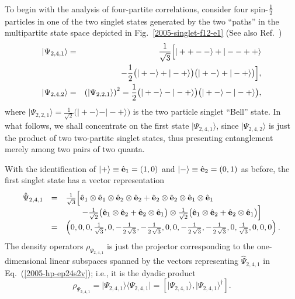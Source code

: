 \documentclass[pra,amsfonts,showpacs,showkeys,preprint]{revtex4}
\begin{document}
To begin with the analysis of four-partite correlations,  consider four spin-${1\over 2}$
particles in one of the two singlet states generated by the two ``paths''
in the multipartite state space depicted in Fig.~\ref{2005-singlet-f12-e1}
(See also Ref.~\cite{schimpf-svozil})
\begin{eqnarray}
\vert \Psi_{2,4,1} \rangle
&=&
{1\over \sqrt{3}}\Bigl[
\vert ++-- \rangle +
\vert --++ \rangle \nonumber \\
&&\qquad
\qquad
-  {1\over 2}
\bigl(
\vert +- \rangle +
\vert -+ \rangle
\bigr)
\bigl(
\vert +- \rangle +
\vert -+ \rangle
\bigr)
\Bigr],
\label{2005-hp-ep24s2}
\\
\vert \Psi_{2,4,2} \rangle
&=&
\left( \vert \Psi_{2,2,1} \rangle \right)^2
=
{1\over 2}
\bigl(
\vert +- \rangle -
\vert -+ \rangle
\bigr)
\bigl(
\vert +- \rangle -
\vert -+ \rangle
\bigr),
\label{2004-gtq-s1}
\end{eqnarray}
where
$\vert \Psi_{2,2,1} \rangle = \frac{1}{\sqrt{ 2}}
\bigl(
\vert +- \rangle -
\vert -+ \rangle
\bigr)
$
is the two particle singlet ``Bell'' state.
In what follows, we shall concentrate on the first state
$\vert \Psi_{2,4,1} \rangle$, since  $\vert \Psi_{2,4,2} \rangle$
is just the product of two two-partite singlet states,
thus presenting entanglement merely among two pairs of two quanta.

With the identification of
$
\vert +\rangle
\equiv {\hat {\bf e}}_1 =(1,0)
$
and
$
\vert -\rangle \equiv {\hat {\bf e}}_2 =(0,1)
$ as before,
the first singlet state has a vector representation
\begin{equation}
\begin{array}{rcl}
\hat  \Psi_{2,4,1}
&=&
{1\over \sqrt{3}}\Bigl[
{\hat {\bf e}}_1\otimes {\hat {\bf e}}_1\otimes {\hat {\bf e}}_2\otimes {\hat {\bf e}}_2+
{\hat {\bf e}}_2\otimes {\hat {\bf e}}_2\otimes {\hat {\bf e}}_1\otimes {\hat {\bf e}}_1
 \nonumber \\
&&\qquad
-  {1\over \sqrt{2}}\bigl({\hat {\bf e}}_1\otimes {\hat {\bf e}}_2+{\hat {\bf e}}_2\otimes {\hat {\bf e}}_1 \bigr)
\otimes
 {1\over \sqrt{2}}\bigl({\hat {\bf e}}_1\otimes {\hat {\bf e}}_2+{\hat {\bf e}}_2\otimes {\hat {\bf e}}_1 \bigr)
\Bigr]\nonumber \\
&=&\left( 0,0,0,\frac{1}{{\sqrt{3}}},0,
  -\frac{1}{2\,{\sqrt{3}}},-\frac{1}{2\,{\sqrt{3}}},0,
  0,-\frac{1}{2\,{\sqrt{3}}},-\frac{1}{2\,{\sqrt{3}}},
  0,\frac{1}{{\sqrt{3}}},0,0,0\right).
\label{2005-hp-ep24s2v}
\end{array}
\end{equation}
The density operators $\rho_{\Psi_{2,4,1}}$
is just the projector corresponding to the one-dimensional
linear subspaces spanned by
the vectors representing
$ \hat \Psi_{2,4,1}$
in Eq.~(\ref{2005-hp-ep24s2v}); i.e.,
it is the dyadic product
\begin{equation}
\rho_{\Psi_{2,4,1}} = \vert { \Psi}_{2,4,1}\rangle \langle { \Psi}_{2,4,1}\vert =
\left[\vert { \Psi}_{2,4,1}\rangle,\vert { \Psi}_{2,4,1}\rangle^\dagger \right].
\end{equation}
\end{document}
